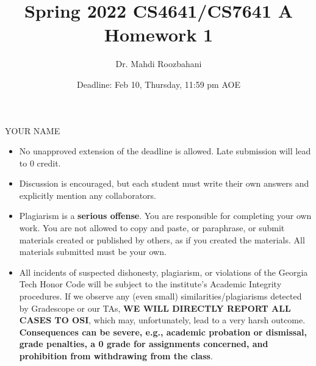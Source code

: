 \documentclass{article}
\title{Spring 2022 CS4641/CS7641 A Homework 1}
\author{Dr. Mahdi Roozbahani}
\date{Deadline: Feb 10, Thursday, 11:59 pm AOE}
\begin{document}
\maketitle
\begin{center}
    YOUR NAME\\
    \bigskip
\end{center}
\begin{itemize}
    \item No unapproved extension of the deadline is allowed. Late submission will lead to 0 credit.
    \item Discussion is encouraged, but each student must write their own answers and explicitly mention any collaborators.
    \item \color{red}Plagiarism is a \textbf{serious offense}. You are responsible for completing your own work. You are not allowed to copy and paste, or paraphrase, or submit materials created or published by others, as if you created the materials. All materials submitted must be your own.\color{black}
    \item \color{red}All incidents of suspected dishonesty, plagiarism, or violations of the Georgia Tech Honor Code will be subject to the institute’s Academic Integrity procedures. If we observe any (even small) similarities/plagiarisms detected by Gradescope or our TAs, \textbf{WE WILL DIRECTLY REPORT ALL CASES TO OSI}, which may, unfortunately, lead to a very harsh outcome. \textbf{Consequences can be severe, e.g., academic probation or dismissal, grade penalties, a 0 grade for assignments concerned, and prohibition from withdrawing from the class}.
\end{itemize}
\end{document}
